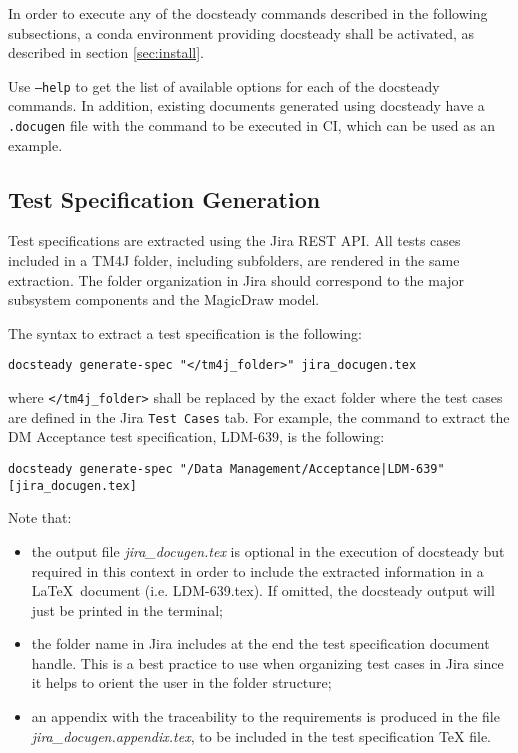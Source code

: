 In order to execute any of the docsteady commands described in the following subsections, a conda environment providing docsteady shall be activated, as described in section \ref{sec:install}.

Use \texttt{--help} to get the list of available options for each of the docsteady commands.
In addition, existing documents generated using docsteady have a \texttt{.docugen} file with the command to be executed in CI, which can be used as an example.



\subsection{Test Specification Generation}

Test specifications are extracted using the Jira REST API.
All tests cases included in a TM4J folder, including subfolders, are rendered in the same extraction.
The folder organization in Jira should correspond to the major subsystem components and the MagicDraw model.

The syntax to extract a test specification is the following:

\texttt{docsteady generate-spec "</tm4j\_folder>" jira\_docugen.tex}

where \texttt{</tm4j\_folder>} shall be replaced by the exact folder where the test cases are defined in the Jira \texttt{Test Cases} tab.
For example, the command to extract the DM Acceptance test specification, LDM-639, is the following:

\texttt{docsteady generate-spec "/Data Management/Acceptance|LDM-639" [jira\_docugen.tex]}

Note that:
\begin{itemize}
\item the output file \textit{jira\_docugen.tex} is optional in the execution of docsteady but required in this context in order to include the extracted information in a \LaTeX~document (i.e. LDM-639.tex). If omitted, the docsteady output will just be printed in the terminal;
\item the folder name in Jira includes at the end the test specification document handle. This is a best practice to use when organizing test cases in Jira since it helps to orient the user in the folder structure;
\item an appendix with the traceability to the requirements is produced in the file \textit{jira\_docugen.appendix.tex}, to be included in the test specification TeX file. 
\end{itemize}

